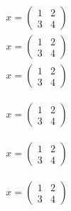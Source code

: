 \begin{align}
x = \begin{pmatrix}
1 & 2 \\
3 & 4
\end{pmatrix}
\end{align}
\begin{align}
x = \begin{pmatrix}
1 & 2 \\
3 & 4
\end{pmatrix}
\end{align}
\begin{align}
x = \begin{pmatrix}
1 & 2 \\
3 & 4
\end{pmatrix}
\end{align}
\begin{frame}[t]
\begin{align}
x = \begin{pmatrix}
1 & 2 \\
3 & 4
\end{pmatrix}
\end{align}
\end{frame}

\begin{frame}[t]
\begin{align}
x = \begin{pmatrix}
1 & 2 \\
3 & 4
\end{pmatrix}
\end{align}
\end{frame}

\begin{frame}[t]
\begin{align}
x = \begin{pmatrix}
1 & 2 \\
3 & 4
\end{pmatrix}
\end{align}
\end{frame}

